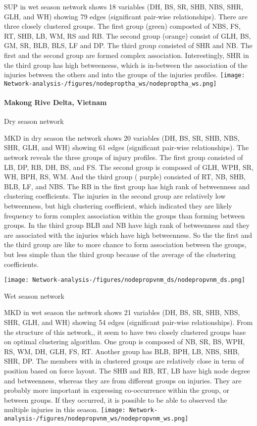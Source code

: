 SUP in wet season network shows  18  variables (DH, BS, SR, SHB, NBS, SHR, GLH, and WH) showing  79 edges (significant pair-wise relationships). There are three closely clustered groups. The first group (green) composted of NBS, FS, RT, SHB, LB, WM, RS and RB. The second group (orange) consist of GLH, BS, GM, SR, BLB, BLS, LF and DP. The third group consisted of SHR and NB. The first and the second group are formed complex association. Interestingly, SHR in the third group has high betweeneess, which is in-between the association of the injuries between the others and into the groups of the injuries profiles. 
\texttt{[image: Network-analysis-/figures/nodeproptha\_ws/nodeproptha\_ws.png]}


\paragraph{Makong Rive Delta, Vietnam}

Dry season network

MKD in dry season the network shows  20 variables (DH, BS, SR, SHB, NBS, SHR, GLH, and WH) showing  61 edges (significant pair-wise relationships).  The network reveals the three groups of injury profiles. The first group consisted of LB, DP, RB, DH, BS, and FS. The second group is composed of GLH, WPH, SR, WH, BPH, RS, WM. And the third group ( purple) consisted of RT, NB, SHB, BLB, LF, and NBS. The RB in the first group has high rank of betweenness and clustering coefficients. The injuries in the second group are relatively low betweenness, but high clustering coefficient, which indicated they are likely frequency to form complex association within the groups than forming between groups. In the third group BLB and NB have high rank of betweenness and they are associated with the injuries which have high betweenness. So the the first and the third group are like to more chance to form association between the groups, but less simple than the third group because of the average of the clustering coefficients.

\texttt{[image: Network-analysis-/figures/nodepropvnm\_ds/nodepropvnm\_ds.png]}

Wet season network

MKD in wet season the network shows  21 variables (DH, BS, SR, SHB, NBS, SHR, GLH, and WH) showing  54 edges (significant pair-wise relationships). From the structure of this network,, it seem to have two closely clustered groups base on optimal clustering algorithm. One group is composed of NB, SR, BS, WPH, RS, WM, DH, GLH, FS, RT.  Another group has BLB, BPH, LB, NBS, SHB, SHR, DP. The members with in clustered groups are relatively close in term of position based on  force layout.  The SHB and RB, RT, LB have high node degree and betweenness, whereas they are from different groups on injuries. They are probably more important in expressing co-occurrence within the group, or between groups. If they occurred, it is possible to  be able to observed the multiple injuries in this season.
\texttt{[image: Network-analysis-/figures/nodepropvnm\_ws/nodepropvnm\_ws.png]}



